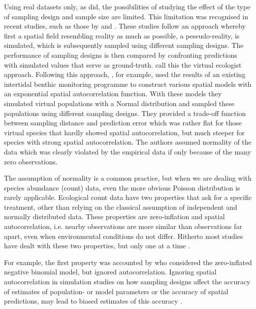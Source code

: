 \documentclass[review]{elsarticle}
\begin{document}
Using real datasets only, as \citet{fortin1989} did, the possibilities of studying the effect of the type of sampling design and sample size are limited. This limitation was recognised in recent studies, such as those  by \citet{perner2004, rachowicz2006, bijleveld2012} and \citet{foster2014}. These studies follow an approach whereby first a spatial field resembling reality as much as possible, a peseudo-reality, is simulated, which is subsequently sampled using different sampling designs. The performance of sampling designs is then compared by confronting predictions with simulated values that serve as ground-truth.  \citet{zurell2010} call this the virtual ecologist approach.  Following this approach, \citet{bijleveld2012}, for example, used the results of an existing intertidal benthic monitoring programme to construct various spatial models with an exponential spatial autocorrelation function. With these models they simulated virtual populations with a Normal distribution and sampled these populations using different sampling designs. They provided a trade-off function between sampling distance and prediction error which was rather flat for those virtual species that hardly showed spatial autocorrelation, but much steeper for species with strong spatial autocorrelation. The authors assumed normality of the data which was clearly violated by the empirical data if only because of the many zero observations.

The assumption of normality is a common practice, but when we are dealing with species abundance (count) data, even the more obvious Poisson distribution is rarely applicable. Ecological count data have two properties that ask for a specific treatment, other than relying on the classical assumption of independent and normally distributed data. These properties are zero-inflation \citep{martin2005, clarke1988, lewis2011} and spatial autocorrelation, i.e. nearby observations are more similar than observations far apart, even when environmental conditions do not differ. Hitherto most studies have dealt with these two properties, but only one at a time \citep{tyre2003, bijleveld2012}.

For example, the first property was accounted by \citet{tyre2003} who considered the zero-inflated negative binomial model, but ignored autocorrelation. Ignoring spatial autocorrelation in simulation studies on how sampling designs affect the accuracy of estimates of population- or model parameters or the accuracy of spatial predictions, may lead to biased estimates of this accuracy \citep{legendre2002}.
\end{document}
